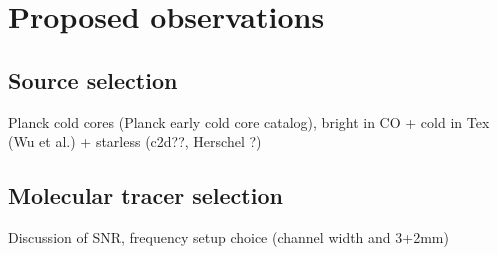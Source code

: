\section{Proposed observations}
\subsection{Source selection}
  Planck cold cores (Planck early cold core catalog), bright in CO + cold in Tex (Wu et al.) + starless (c2d??, Herschel ?)
\subsection{Molecular tracer selection}
  Discussion of SNR, frequency setup choice (channel width and 3+2mm)
  